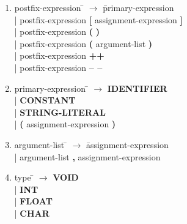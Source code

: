\documentclass[12pt]{article}
\begin{document}
\begin{enumerate}
\item \begin{tabbing} postfix-expression \= $\rightarrow$ \= primary-expression \\
	\> \hspace*{0.05cm} | \> postfix-expression \textbf{[} assignment-expression \textbf{]} \\
	\> \hspace*{0.05cm} | \> postfix-expression \textbf{(} \textbf{)} \\
	\> \hspace*{0.05cm} | \> postfix-expression \textbf{(} argument-list \textbf{)} \\
	\> \hspace*{0.05cm} | \> postfix-expression \textbf{++} \\
	\> \hspace*{0.05cm} | \> postfix-expression \textbf{-- --}
\end{tabbing}

\item \begin{tabbing} primary-expression \= $\rightarrow$ \= \textbf{IDENTIFIER} \\
	\> \hspace*{0.05cm} | \> \textbf{CONSTANT} \\
	\> \hspace*{0.05cm} | \> \textbf{STRING-LITERAL} \\
	\> \hspace*{0.05cm} | \> \textbf{(} assignment-expression \textbf{)}
\end{tabbing}

\item \begin{tabbing} argument-list \= $\rightarrow$ \= assignment-expression \\
	\> \hspace*{0.05cm} | \> argument-list \textbf{,} assignment-expression
\end{tabbing}

\item \begin{tabbing} type \= $\rightarrow$ \= \textbf{VOID} \\
	\> \hspace*{0.05cm} | \> \textbf{INT} \\
	\> \hspace*{0.05cm} | \> \textbf{FLOAT} \\
	\> \hspace*{0.05cm} | \> \textbf{CHAR}
\end{tabbing}

\end{enumerate}
\normalsize
\end{document}
